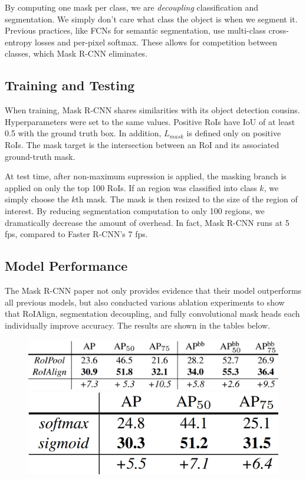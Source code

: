 By computing one mask per class, we are \textit{decoupling} classification and segmentation. We simply don't care what class the object is when we segment it. Previous practices, like FCNs for semantic segmentation, use multi-class cross-entropy losses and per-pixel softmax. These allows for competition between classes, which Mask R-CNN eliminates.

\subsection{Training and Testing}
When training, Mask R-CNN shares similarities with its object detection cousins. Hyperparameters were set to the same values. Positive RoIs have IoU of at least 0.5 with the ground truth box. In addition, $L_{mask}$ is defined only on positive RoIs. The mask target is the intersection between an RoI and its associated ground-truth mask. 

At test time, after non-maximum supression is applied, the masking branch is applied on only the top 100 RoIs. If an region was classified into class $k$, we simply choose the $k$th mask. The mask is then resized to the size of the region of interest. By reducing segmentation computation to only 100 regions, we dramatically decrease the amount of overhead. In fact, Mask R-CNN runs at 5 fps, compared to Faster R-CNN's 7 fps.

\subsection{Model Performance}
The Mask R-CNN paper not only provides evidence that their model outperforms all previous models, but also conducted various ablation experiments to show that RoIAlign, segmentation decoupling, and fully convolutional mask heads each individually improve accuracy. The results are shown in the tables below.


\begin{figure}[htbp]
	\centering
	\begin{minipage}{0.55\textwidth}
		\centering
		\includegraphics[width=1\textwidth]{images/moreroialigncomparison.PNG} %
	\end{minipage}\hfill
	\begin{minipage}{0.35\textwidth}
		\centering
		\includegraphics[width=1\textwidth]{images/binarymaskcomparison.PNG} %
	\end{minipage}
\end{figure}


